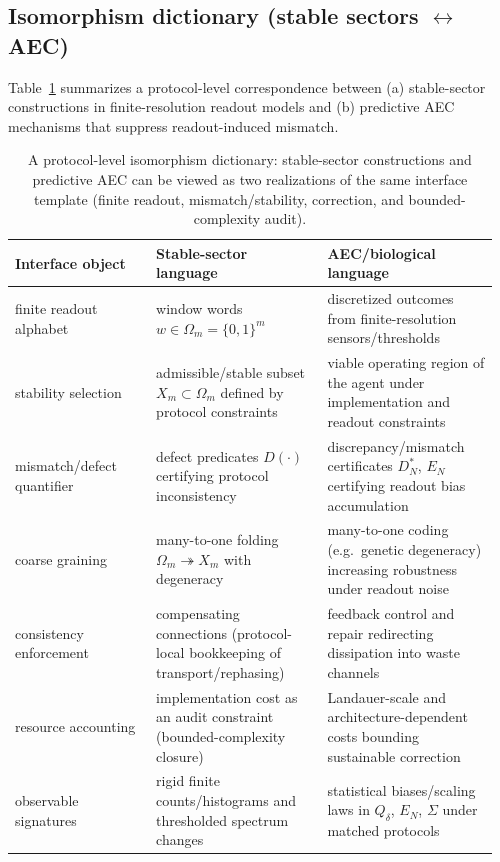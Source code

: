 \subsection{Isomorphism dictionary (stable sectors $\leftrightarrow$ AEC)}
Table~\ref{tab:isomorphism_dictionary} summarizes a protocol-level correspondence between (a) stable-sector constructions in finite-resolution readout models and (b) predictive AEC mechanisms that suppress readout-induced mismatch.

\begin{table}[t]
\centering
\small
\setlength{\tabcolsep}{8pt}
\renewcommand{\arraystretch}{1.15}
\begin{tabular}{p{0.28\linewidth}p{0.34\linewidth}p{0.34\linewidth}}
\toprule
Interface object & Stable-sector language & AEC/biological language \\
\midrule
finite readout alphabet & window words $w\in\Omega_m=\{0,1\}^m$ & discretized outcomes from finite-resolution sensors/thresholds \\
stability selection & admissible/stable subset $X_m\subset\Omega_m$ defined by protocol constraints & viable operating region of the agent under implementation and readout constraints \\
mismatch/defect quantifier & defect predicates $D(\cdot)$ certifying protocol inconsistency & discrepancy/mismatch certificates $D_N^\ast$, $E_N$ certifying readout bias accumulation \\
coarse graining & many-to-one folding $\Omega_m\twoheadrightarrow X_m$ with degeneracy & many-to-one coding (e.g.\ genetic degeneracy) increasing robustness under readout noise \\
consistency enforcement & compensating connections (protocol-local bookkeeping of transport/rephasing) & feedback control and repair redirecting dissipation into waste channels \\
resource accounting & implementation cost as an audit constraint (bounded-complexity closure) & Landauer-scale and architecture-dependent costs bounding sustainable correction \\
observable signatures & rigid finite counts/histograms and thresholded spectrum changes & statistical biases/scaling laws in $Q_\delta$, $E_N$, $\Sigma$ under matched protocols \\
\bottomrule
\end{tabular}
\caption{A protocol-level isomorphism dictionary: stable-sector constructions and predictive AEC can be viewed as two realizations of the same interface template (finite readout, mismatch/stability, correction, and bounded-complexity audit).}
\label{tab:isomorphism_dictionary}
\end{table}

